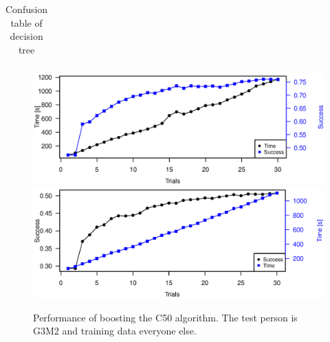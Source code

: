 \begin{table}[H]
    \centering
    \begin{subtable}{0.005\textwidth}
    \end{subtable}
    \begin{subtable}{0.8\textwidth}
        \centering
    \end{subtable}

    \begin{subtable}{0.005\textwidth}
        \flushright
    \end{subtable}
    \begin{subtable}{0.8\textwidth}
        \begin{subtable}{\textwidth}
            \centering
            \begin{tabular}{*{11}{c}}
                
            \end{tabular}
            \caption{Confusion table of decision tree}
            \label{tb:tree_confus}
        \end{subtable}
    \end{subtable}
\end{table}

\begin{figure}[H]
\includegraphics[width = \textwidth]{graphics/tree_timing}
\includegraphics[width = \textwidth]{graphics/tree_timing_entropy}
\caption{Performance of boosting the C50 algorithm. The test person is G3M2 and training data everyone else.}
\label{fig:tree_timing}
\end{figure}

